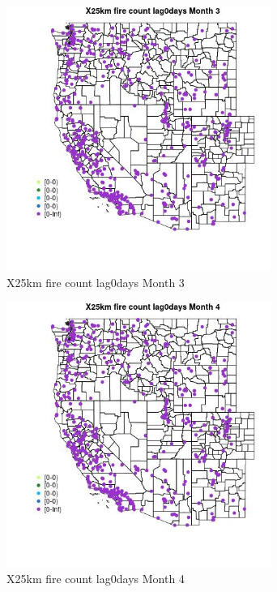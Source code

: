 \begin{figure} 
\centering  
\includegraphics[width=0.77\textwidth]{Code_Outputs/Report_ML_input_PM25_Step4_part_e_de_duplicated_aves_compiled_2019-05-14wNAs_MapObsMo3X25km_fire_count_lag0days.jpg} 
\caption{\label{fig:Report_ML_input_PM25_Step4_part_e_de_duplicated_aves_compiled_2019-05-14wNAsMapObsMo3X25km_fire_count_lag0days}X25km fire count lag0days Month 3} 
\end{figure} 
 

\begin{figure} 
\centering  
\includegraphics[width=0.77\textwidth]{Code_Outputs/Report_ML_input_PM25_Step4_part_e_de_duplicated_aves_compiled_2019-05-14wNAs_MapObsMo4X25km_fire_count_lag0days.jpg} 
\caption{\label{fig:Report_ML_input_PM25_Step4_part_e_de_duplicated_aves_compiled_2019-05-14wNAsMapObsMo4X25km_fire_count_lag0days}X25km fire count lag0days Month 4} 
\end{figure} 
 

